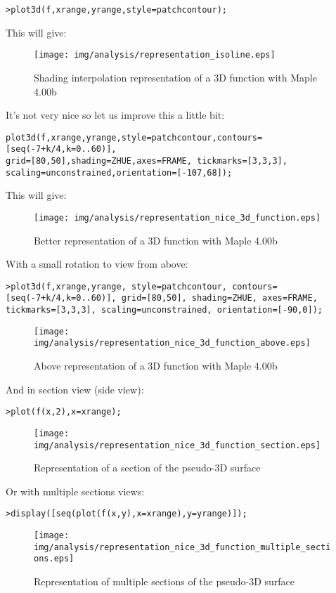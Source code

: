 \texttt{>plot3d(f,xrange,yrange,style=patchcontour);}

This will give:

\begin{figure}[H]
\centering
\texttt{[image: img/analysis/representation\_isoline.eps]}
\caption{Shading interpolation representation of a 3D function with Maple 4.00b}
\end{figure}

It's not very nice so let us improve this a little bit:

\texttt{plot3d(f,xrange,yrange,style=patchcontour,contours=[seq(-7+k/4,k=0..60)],\\
grid=[80,50],shading=ZHUE,axes=FRAME, tickmarks=[3,3,3],\\ scaling=unconstrained,orientation=[-107,68]);}

This will give:

\begin{figure}[H]
\centering
\texttt{[image: img/analysis/representation\_nice\_3d\_function.eps]}
\caption{Better representation of a 3D function with Maple 4.00b}
\end{figure}

With a small rotation to view from above:

\texttt{>plot3d(f,xrange,yrange, style=patchcontour, contours=[seq(-7+k/4,k=0..60)], grid=[80,50], shading=ZHUE, axes=FRAME, tickmarks=[3,3,3], scaling=unconstrained, orientation=[-90,0]);}

\begin{figure}[H]
\centering
\texttt{[image: img/analysis/representation\_nice\_3d\_function\_above.eps]}
\caption{Above representation of a 3D function with Maple 4.00b}
\end{figure}

And in section view (side view):

\texttt{>plot(f(x,2),x=xrange);}

\begin{figure}[H]
\centering
\texttt{[image: img/analysis/representation\_nice\_3d\_function\_section.eps]}
\caption{Representation of a section of the pseudo-3D surface}
\end{figure}

Or with multiple sections views:

\texttt{>display([seq(plot(f(x,y),x=xrange),y=yrange)]);}

\begin{figure}[H]
\centering
\texttt{[image: img/analysis/representation\_nice\_3d\_function\_multiple\_sections.eps]}
\caption{Representation of multiple sections of the pseudo-3D surface}
\end{figure}

